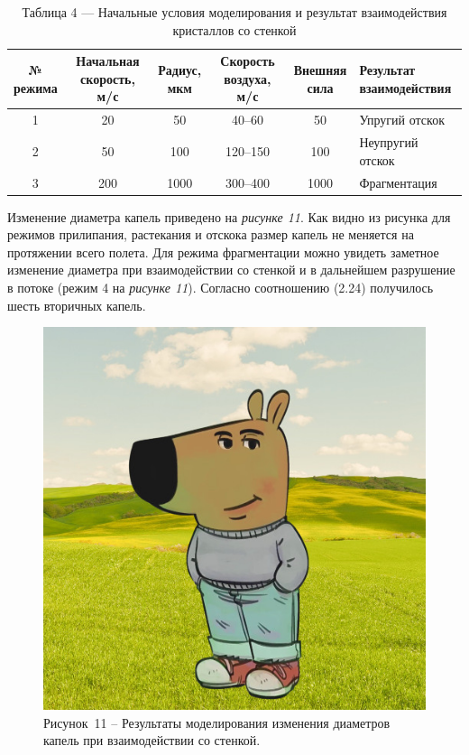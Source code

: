 \begin{table}[H]
	\caption*{Таблица 4 — Начальные условия моделирования и результат взаимодействия кристаллов со стенкой}
	\small
	\centering
	\begin{tabular}{|c|c|c|c|c|l|}
		\hline
		\makecell{\textbf{№}\\\textbf{режима}} 
		& \makecell{\textbf{Начальная}\\\textbf{скорость, м/с}} 
		& \makecell{\textbf{Радиус,}\\\textbf{мкм}} 
		& \makecell{\textbf{Скорость}\\\textbf{воздуха, м/с}} 
		& \makecell{\textbf{Внешняя}\\\textbf{сила}} 
		& \makecell{\textbf{Результат}\\\textbf{взаимодействия}} \\
		\hline
		1 & 20  &   50 & 40--60   &  50 & Упругий отскок       \\ \hline
		2 & 50 & 100 & 120--150 &  100 & Неупругий отскок       \\ \hline
		3 & 200  & 1000 & 300--400 &  1000 & Фрагментация           \\ \hline
	\end{tabular}
\end{table}

Изменение диаметра капель приведено на \textit{рисунке 11}. Как видно из рисунка для режимов прилипания, растекания и отскока размер капель не меняется на протяжении всего полета. Для режима фрагментации можно увидеть заметное изменение диаметра при взаимодействии со стенкой и в дальнейшем разрушение в потоке (режим 4 на \textit{рисунке 11}). Согласно соотношению (2.24) получилось шесть вторичных капель.

 \begin{figure}[H]
	\centering
	\includegraphics[width=\textwidth]{figures/chill-guy.jpeg}
	\caption*{Рисунок~11 – Результаты моделирования изменения диаметров капель при взаимодействии со стенкой.}
	\label{fig:-9}
\end{figure}

